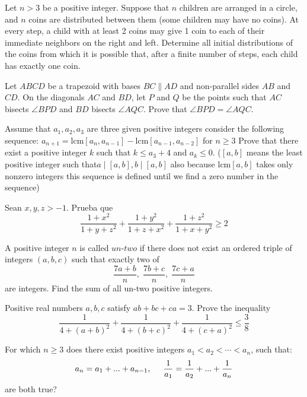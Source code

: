 \documentclass[11pt]{scrartcl}
\begin{document}
\begin{problem}[IMO SL 2022/C4]
Let $n > 3$ be a positive integer. Suppose that $n$ children are arranged in a circle, and $n$ coins are distributed between them (some children may have no coins). At every step, a child with at least 2 coins may give 1 coin to each of their immediate neighbors on the right and left. Determine all initial distributions of the coins from which it is possible that, after a finite number of steps, each child has exactly one coin.  
\end{problem}
\begin{problem}
Let $ABCD$ be a trapezoid with bases $BC \parallel AD$ and non-parallel sides $AB$ and $CD$. On the diagonals $AC$ and $BD$, let $P$ and $Q$ be the points such that $AC$ bisects $\angle BPD$ and $BD$ bisects $\angle AQC$. Prove that $\angle BPD = \angle AQC$.
\end{problem}
\begin{problem}
Assume that $a_1, a_2, a_3$ are three given positive integers consider the following sequence:
$a_{n+1}=\text{lcm}[a_n, a_{n-1}]-\text{lcm}[a_{n-1}, a_{n-2}]$ for $n\ge 3$
Prove that there exist a positive integer $k$ such that $k\le a_3+4$ and $a_k\le 0$.
($[a, b]$ means the least positive integer such that$ a\mid[a,b], b\mid[a, b]$ also because $\text{lcm}[a, b]$ takes only nonzero integers this sequence is defined until we find a zero number in the sequence)
\end{problem}
\begin{problem}
Sean $x,y,z >-1$. Prueba que 
\[\frac{1+x^2}{1+y+z^2}+\frac{1+y^2}{1+z+x^2}+\frac{1+z^2}{1+x+y^2} \geq 2\]
\end{problem}
\begin{problem}[DIME 2022/11]
A positive integer $n$ is called $\textit{un-two}$ if there does not exist an ordered triple of integers $(a,b,c)$ such that exactly two of$$\dfrac{7a+b}{n},\;\dfrac{7b+c}{n},\;\dfrac{7c+a}{n}$$are integers. Find the sum of all un-two positive integers.
\end{problem}
\begin{problem}
Positive real numbers $a, b,c$ satisfy $ab + bc+ ca = 3$. Prove the inequality$$\frac{1}{4+(a+b)^2}+\frac{1}{4+(b+c)^2}+\frac{1}{4+(c+a)^2}\le \frac{3}{8}$$
\end{problem}
\begin{problem}
For which $n\ge 3$ does there exist positive integers $a_1<a_2<\cdots <a_n$, such that:$$a_n=a_1+...+a_{n-1}, \hspace{0.5cm} \frac{1}{a_1}=\frac{1}{a_2}+...+\frac{1}{a_n}$$are both true?
\end{problem}
\end{document}
